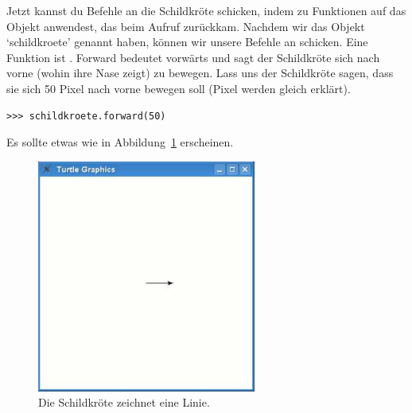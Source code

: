 Jetzt kannst du Befehle an die Schildkröte schicken, indem zu Funktionen auf das Objekt anwendest, das beim  Aufruf zurückkam. Nachdem wir das Objekt `schildkroete' genannt haben, können wir unsere Befehle an  schicken.
Eine Funktion ist  . Forward bedeutet vorwärts und sagt der Schildkröte sich nach vorne (wohin ihre Nase zeigt) zu bewegen. Lass uns der Schildkröte sagen, dass sie sich 50 Pixel nach vorne bewegen soll (Pixel werden gleich erklärt).

\begin{Verbatim}[frame=single]
>>> schildkroete.forward(50)
\end{Verbatim}

Es sollte etwas wie in Abbildung~\ref{fig11} erscheinen.

\begin{figure}
\begin{center}
\includegraphics[width=72mm]{images/figure11}
\end{center}
\caption{Die Schildkröte zeichnet eine Linie.}\label{fig11}
\end{figure}

